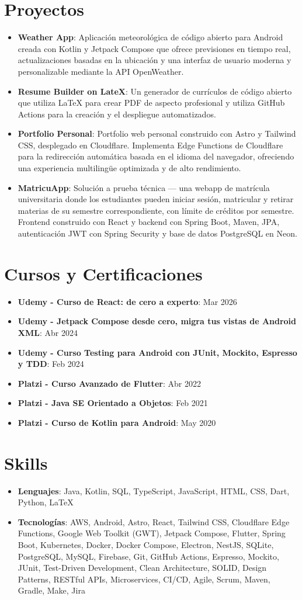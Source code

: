 \documentclass[letterpaper,11pt]{article}
\newcommand{\resumeItem}[2]{
  \item\small{
    \textbf{#1}{: #2 \vspace{-2pt}}
  }
}
\newcommand{\resumeSubItem}[2]{\resumeItem{#1}{#2}\vspace{-4pt}}
\newcommand{\resumeSubHeadingListStart}{\begin{itemize}[leftmargin=*]}
\newcommand{\resumeSubHeadingListEnd}{\end{itemize}}
\begin{document}
\section{Proyectos}
\resumeSubHeadingListStart
\resumeSubItem{Weather App}
{Aplicación meteorológica de código abierto para Android creada con Kotlin y Jetpack Compose que ofrece previsiones en tiempo real, actualizaciones basadas en la ubicación y una interfaz de usuario moderna y personalizable mediante la API OpenWeather.}
\resumeSubItem{Resume Builder on LateX}
{Un generador de currículos de código abierto que utiliza LaTeX para crear PDF de aspecto profesional y utiliza GitHub Actions para la creación y el despliegue automatizados.}
\resumeSubItem{Portfolio Personal}
{Portfolio web personal construido con Astro y Tailwind CSS, desplegado en Cloudflare. Implementa Edge Functions de Cloudflare para la redirección automática basada en el idioma del navegador, ofreciendo una experiencia multilingüe optimizada y de alto rendimiento.}
\resumeSubItem{MatricuApp}
{Solución a prueba técnica — una webapp de matrícula universitaria donde los estudiantes pueden iniciar sesión, matricular y retirar materias de su semestre correspondiente, con límite de créditos por semestre. Frontend construido con React y backend con Spring Boot, Maven, JPA, autenticación JWT con Spring Security y base de datos PostgreSQL en Neon.}
\resumeSubHeadingListEnd

\section{Cursos y Certificaciones}
\resumeSubHeadingListStart
\resumeSubItem{Udemy - Curso de React: de cero a experto}{Mar 2026}
\resumeSubItem{Udemy - Jetpack Compose desde cero, migra tus vistas de Android XML}{Abr 2024}
\resumeSubItem{Udemy - Curso Testing para Android con JUnit, Mockito, Espresso y TDD}{Feb 2024}
\resumeSubItem{Platzi - Curso Avanzado de Flutter}{Abr 2022}
\resumeSubItem{Platzi - Java SE Orientado a Objetos}{Feb 2021}
\resumeSubItem{Platzi - Curso de Kotlin para Android}{May 2020}
\resumeSubHeadingListEnd

\section{Skills}
\resumeSubHeadingListStart
\item{
            \textbf{Lenguajes}{: Java, Kotlin, SQL, TypeScript, JavaScript, HTML, CSS, Dart, Python, LaTeX}

      }
\item {
            \textbf{Tecnologías}{: AWS, Android, Astro, React, Tailwind CSS, Cloudflare Edge Functions, Google Web Toolkit (GWT), Jetpack Compose, Flutter, Spring Boot, Kubernetes, Docker, Docker Compose, Electron, NestJS, SQLite, PostgreSQL, MySQL, Firebase, Git, GitHub Actions, Espresso, Mockito, JUnit, Test-Driven Development, Clean Architecture, SOLID, Design Patterns, RESTful APIs, Microservices, CI/CD, Agile, Scrum, Maven, Gradle, Make, Jira}
      }
\resumeSubHeadingListEnd


\end{document}
